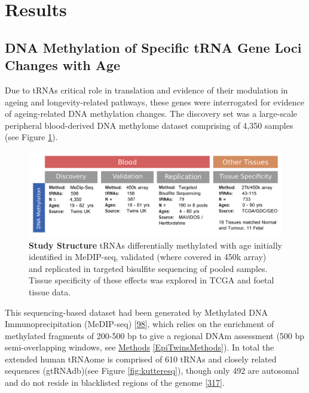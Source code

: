 \documentclass[
]{book}
\begin{document}
\newpage

\hypertarget{res}{%
\section{Results}\label{res}}

\hypertarget{dna-methylation-of-specific-trna-gene-loci-changes-with-age}{%
\subsection{DNA Methylation of Specific tRNA Gene Loci Changes with Age}\label{dna-methylation-of-specific-trna-gene-loci-changes-with-age}}

Due to tRNAs critical role in translation and evidence of their modulation in ageing and longevity-related pathways, these genes were interrogated for evidence of ageing-related DNA methylation changes.
The discovery set was a large-scale peripheral blood-derived DNA methylome dataset comprising of 4,350 samples (see Figure \ref{fig:OverviewOfAnalyses}).

\begin{figure}

{\centering \includegraphics[width=1\linewidth]{figs/OverviewOfAnalysesFigure_tRNA_3} 

}

\caption{\textbf{Study Structure} tRNAs differentially methylated with age initially identified in MeDIP-seq, validated (where covered in 450k array) and replicated in targeted bisulfite sequencing of pooled samples. Tissue specificity of these effects was explored in TCGA and foetal tissue data.}\label{fig:OverviewOfAnalyses}
\end{figure}



This sequencing-based dataset had been generated by Methylated DNA Immunoprecipitation (MeDIP-seq) {[}\protect\hyperlink{ref-Down2009}{98}{]}, which relies on the enrichment of methylated fragments of 200-500 bp to give a regional DNAm assessment (500 bp semi-overlapping windows, see \protect\hyperlink{EpiTwinsMethods}{Methods} \ref{EpiTwinsMethods}).
In total the extended human tRNAome is comprised of 610 tRNAs and closely related sequences (gtRNAdb)(see Figure \ref{fig:kutteresq}), though only 492 are autosomal and do not reside in blacklisted regions of the genome {[}\protect\hyperlink{ref-Amemiya2019}{317}{]}.
\end{document}

